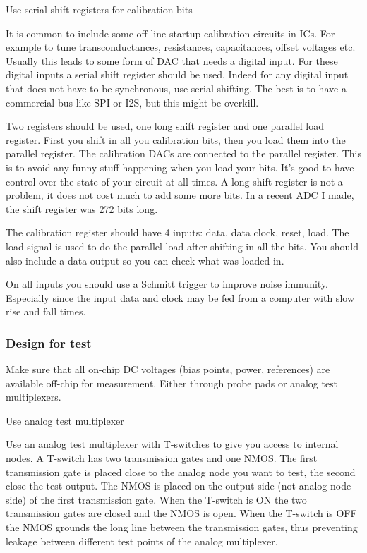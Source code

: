Use serial shift registers for calibration bits

It is common to include some off-line startup calibration circuits in
ICs. For example to tune transconductances, resistances, capacitances,
offset voltages etc. Usually this leads to some form of DAC that needs a
digital input. For these digital inputs a serial shift register should
be used. Indeed for any digital input that does not have to be
synchronous, use serial shifting. The best is to have a commercial bus
like SPI or I2S, but this might be overkill.

Two registers should be used, one long shift register and one parallel
load register. First you shift in all you calibration bits, then you
load them into the parallel register. The calibration DACs are connected
to the parallel register. This is to avoid any funny stuff happening
when you load your bits. It's good to have control over the state of
your circuit at all times. A long shift register is not a problem, it
does not cost much to add some more bits. In a recent ADC I made, the
shift register was 272 bits long.

The calibration register should have 4 inputs: data, data clock, reset,
load. The load signal is used to do the parallel load after shifting in
all the bits. You should also include a data output so you can check
what was loaded in.

On all inputs you should use a Schmitt trigger to improve noise
immunity. Especially since the input data and clock may be fed from a
computer with slow rise and fall times.

\subsubsection{Design for test}\label{design-for-test}

Make sure that all on-chip DC voltages (bias points, power, references)
are available off-chip for measurement. Either through probe pads or
analog test multiplexers.

Use analog test multiplexer

Use an analog test multiplexer with T-switches to give you access to
internal nodes. A T-switch has two transmission gates and one NMOS. The
first transmission gate is placed close to the analog node you want to
test, the second close the test output. The NMOS is placed on the output
side (not analog node side) of the first transmission gate. When the
T-switch is ON the two transmission gates are closed and the NMOS is
open. When the T-switch is OFF the NMOS grounds the long line between
the transmission gates, thus preventing leakage between different test
points of the analog multiplexer.

